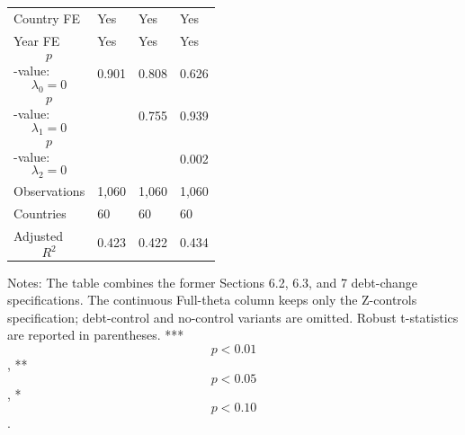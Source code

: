 \begin{table}[H]
\begin{threeparttable}
\begin{tabularx}{\textwidth}{lYYY}
Country FE & Yes & Yes & Yes \\
Year FE & Yes & Yes & Yes \\
$$p$$-value: $$\lambda_0=0$$ & 0.901 & 0.808 & 0.626 \\
$$p$$-value: $$\lambda_1=0$$ &  & 0.755 & 0.939 \\
$$p$$-value: $$\lambda_2=0$$ &  &  & 0.002 \\
Observations & 1,060 & 1,060 & 1,060 \\
Countries & 60 & 60 & 60 \\
Adjusted $$R^2$$ & 0.423 & 0.422 & 0.434 \\
\bottomrule
\end{tabularx}
\begin{tablenotes}[flushleft]\footnotesize
\item Notes: The table combines the former Sections 6.2, 6.3, and 7 debt-change specifications. The continuous Full-theta column keeps only the Z-controls specification; debt-control and no-control variants are omitted. Robust t-statistics are reported in parentheses. *** $$p<0.01$$, ** $$p<0.05$$, * $$p<0.10$$.
\end{tablenotes}
\end{threeparttable}
\end{table}
